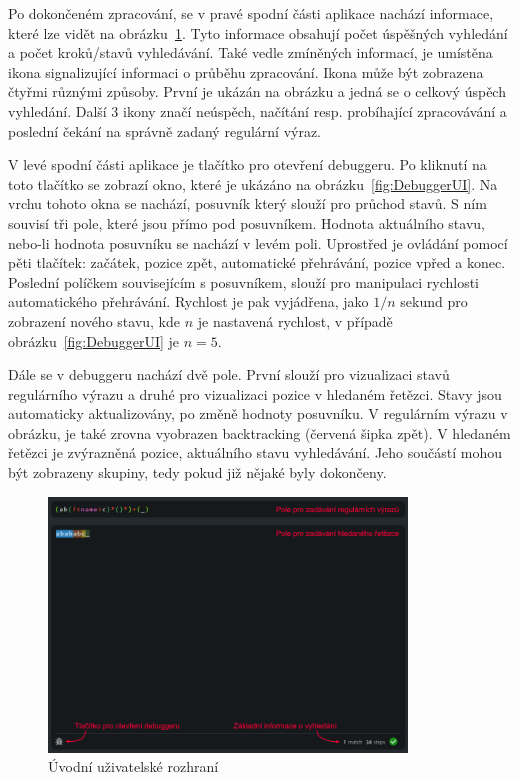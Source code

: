 Po dokončeném zpracování, se v pravé spodní části aplikace nachází informace, které lze vidět na obrázku~\ref{fig:GeneralUI}.
Tyto informace obsahují počet úspěšných vyhledání a počet kroků/stavů vyhledávání.
Také vedle zmíněných informací, je umístěna ikona signalizující informaci o průběhu zpracování.
Ikona může být zobrazena čtyřmi různými způsoby.
První je ukázán na obrázku a jedná se o celkový úspěch vyhledání.
Další 3 ikony značí neúspěch, načítání resp. probíhající zpracovávání a poslední čekání na správně zadaný regulární výraz.

V levé spodní části aplikace je tlačítko pro otevření debuggeru. 
Po kliknutí na toto tlačítko se zobrazí okno, které je ukázáno na obrázku~\ref{fig:DebuggerUI}.
Na vrchu tohoto okna se nachází, posuvník který slouží pro průchod stavů.
S ním souvisí tři pole, které jsou přímo pod posuvníkem.
Hodnota aktuálního stavu, nebo-li hodnota posuvníku se nachází v levém poli.
Uprostřed je ovládání pomocí pěti tlačítek: začátek, pozice zpět, automatické přehrávání, pozice vpřed a konec.
Poslední políčkem souvisejícím s posuvníkem, slouží pro manipulaci rychlosti automatického přehrávání.
Rychlost je pak vyjádřena, jako $1/n$ sekund pro zobrazení nového stavu, kde $n$ je nastavená rychlost, v případě obrázku~\ref{fig:DebuggerUI} je $n = 5$.

Dále se v debuggeru nachází dvě pole. 
První slouží pro vizualizaci stavů regulárního výrazu a druhé pro vizualizaci pozice v hledaném řetězci.
Stavy jsou automaticky aktualizovány, po změně hodnoty posuvníku.
V regulárním výrazu v obrázku, je také zrovna vyobrazen backtracking (červená šipka zpět).
V hledaném řetězci je zvýrazněná pozice, aktuálního stavu vyhledávání.
Jeho součástí mohou být zobrazeny skupiny, tedy pokud již nějaké byly dokončeny.

\begin{figure}[!h]
	\centering
	\includegraphics[width=0.85\textwidth]{Figures/appWindow.png}
	\caption{Úvodní uživatelské rozhraní}
	\label{fig:GeneralUI}
\end{figure}

